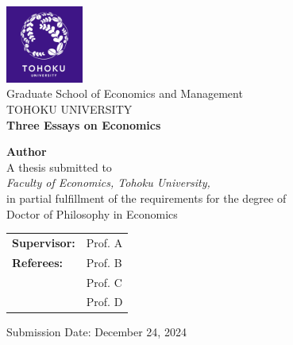 \documentclass[oneside, 12pt, a4paper]{book}
\author{author}
\theoremstyle{definition}\newtheorem{definition}{Definition}
\theoremstyle{theorem}\newtheorem{corollary}{Corollary}
\theoremstyle{definition}\newtheorem{ass}{Assumption}
\theoremstyle{definition}\newtheorem{remark}{Remark}
\theoremstyle{theorem}\newtheorem{prop}{Proposition}
\theoremstyle{theorem}\newtheorem{lemma}{Lemma}
\theoremstyle{definition}\newtheorem{fact}{Fact}
\numberwithin{corollary}{chapter}
\numberwithin{prop}{chapter}
\numberwithin{ass}{chapter}
\numberwithin{definition}{chapter}
\numberwithin{lemma}{chapter}
\numberwithin{equation}{chapter}
\begin{document}

\begin{titlepage}
    \begin{center}
        \includegraphics[width=0.19\textwidth]{logo.png}\\[5pt]
        {Graduate School of Economics and Management}\\[5pt]
        {TOHOKU UNIVERSITY}\\[5pt]
        
        \vspace{1.5cm}
        {\huge\bfseries Three Essays on Economics}
        
        \vspace{1.5cm}
        {\Large\bfseries Author}\\[5pt]
        
        \vspace{2cm}
        {A thesis  submitted to} \\[5pt]
        \emph{{Faculty of Economics, Tohoku University,}}\\[5pt]
        {in partial fulfillment of the requirements for the degree of } \\[5pt]
        {Doctor of Philosophy in Economics} \\[5pt]
        \vfill
        
        \begin{tabular}{l l} 
            \textbf{Supervisor:}  & Prof. A \\ 
            \textbf{Referees:}    & Prof. B \\
                                  & Prof. C \\
                                  & Prof. D
        \end{tabular} 
        
        \vfill
        Submission Date: December 24, 2024
    \end{center}
\end{titlepage}
\end{document}
